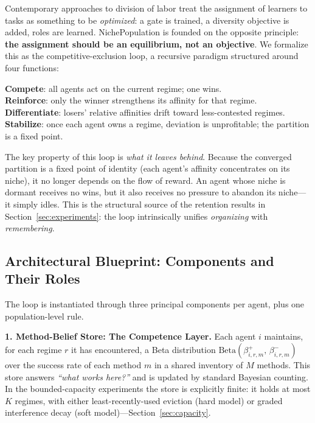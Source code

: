 \documentclass[11pt]{article}
\begin{document}
Contemporary approaches to division of labor treat the assignment of learners to
tasks as something to be \emph{optimized}: a gate is trained, a diversity
objective is added, roles are learned. NichePopulation is founded on the opposite
principle: \textbf{the assignment should be an equilibrium, not an objective}.
We formalize this as the competitive-exclusion loop, a recursive paradigm
structured around four functions:

\begin{designbox}
\textbf{Compete}: all agents act on the current regime; one wins.\\
\textbf{Reinforce}: only the winner strengthens its affinity for that regime.\\
\textbf{Differentiate}: losers' relative affinities drift toward less-contested
regimes.\\
\textbf{Stabilize}: once each agent owns a regime, deviation is unprofitable;
the partition is a fixed point.
\end{designbox}

The key property of this loop is \emph{what it leaves behind}. Because the
converged partition is a fixed point of identity (each agent's affinity
concentrates on its niche), it no longer depends on the flow of reward. An agent
whose niche is dormant receives no wins, but it also receives no pressure to
abandon its niche---it simply idles. This is the structural source of the
retention results in Section~\ref{sec:experiments}: the loop intrinsically
unifies \emph{organizing} with \emph{remembering}.

\subsection{Architectural Blueprint: Components and Their Roles}

The loop is instantiated through three principal components per agent, plus one
population-level rule.

\textbf{1. Method-Belief Store: The Competence Layer.} Each agent $i$ maintains,
for each regime $r$ it has encountered, a Beta distribution
$\mathrm{Beta}(\beta^{+}_{i,r,m},\, \beta^{-}_{i,r,m})$ over the success rate of
each method $m$ in a shared inventory of $M$ methods. This store answers
\emph{``what works here?''} and is updated by standard Bayesian counting. In the
bounded-capacity experiments the store is explicitly finite: it holds at most
$K$ regimes, with either least-recently-used eviction (hard model) or graded
interference decay (soft model)---Section~\ref{sec:capacity}.
\end{document}
